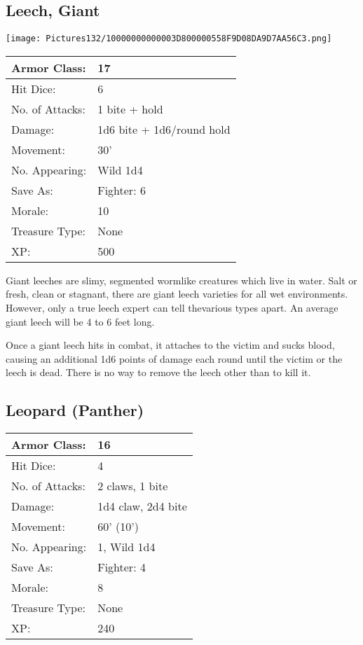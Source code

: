\documentclass[a4paper,twoside,openany,10pt]{book}
\begin{document}
\begin{multicols}{2}
\subsection*{Leech, Giant}\label{leech-giant}


\begin{center} \texttt{[image: Pictures132/10000000000003D800000558F9D08DA9D7AA56C3.png]} \end{center}

\begin{flushleft}
	\begin{tabularx}{0.50\textwidth}{@{}lX@{}}
Armor Class: & 17 \\\hline
Hit Dice: & 6 \\\hline
No. of Attacks: & 1 bite + hold \\\hline
Damage: & 1d6 bite + 1d6/round hold \\\hline
Movement: & 30' \\\hline
No. Appearing: & Wild 1d4 \\\hline
Save As: & Fighter: 6 \\\hline
Morale: & 10 \\\hline
Treasure Type: & None \\\hline
XP: & 500 \\\hline
\end{tabularx}\medskip
\end{flushleft}

Giant leeches are slimy, segmented wormlike creatures which live in water. Salt or fresh, clean or stagnant, there are giant leech varieties for all wet environments. However, only a true leech expert can tell thevarious types apart. An average giant leech will be 4 to 6 feet long.

Once a giant leech hits in combat, it attaches to the victim and sucks blood, causing an additional 1d6 points of damage each round until the victim or the leech is dead. There is no way to remove the leech other than to kill it.


\subsection*{Leopard (Panther)}\label{leopard-panther}

\begin{tabularx}{0.50\textwidth}{@{}lX@{}}
Armor Class: & 16 \\\hline
Hit Dice: & 4 \\\hline
No. of Attacks: & 2 claws, 1 bite \\\hline
Damage: & 1d4 claw, 2d4 bite \\\hline
Movement: & 60' (10') \\\hline
No. Appearing: & 1, Wild 1d4 \\\hline
Save As: & Fighter: 4 \\\hline
Morale: & 8 \\\hline
Treasure Type: & None \\\hline
XP: & 240 \\\hline
\end{tabularx}\medskip


\end{multicols}
\end{document}
